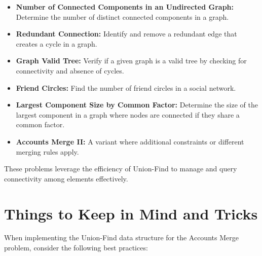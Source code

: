 \begin{itemize}
    \item \textbf{Number of Connected Components in an Undirected Graph:}  
    Determine the number of distinct connected components in a graph.
    
    \item \textbf{Redundant Connection:}  
    Identify and remove a redundant edge that creates a cycle in a graph.
    
    \item \textbf{Graph Valid Tree:}  
    Verify if a given graph is a valid tree by checking for connectivity and absence of cycles.
    
    \item \textbf{Friend Circles:}  
    Find the number of friend circles in a social network.
    
    \item \textbf{Largest Component Size by Common Factor:}  
    Determine the size of the largest component in a graph where nodes are connected if they share a common factor.
    
    \item \textbf{Accounts Merge II:} 
    A variant where additional constraints or different merging rules apply.
\end{itemize}

These problems leverage the efficiency of Union-Find to manage and query connectivity among elements effectively.

\section*{Things to Keep in Mind and Tricks}

When implementing the Union-Find data structure for the Accounts Merge problem, consider the following best practices:

